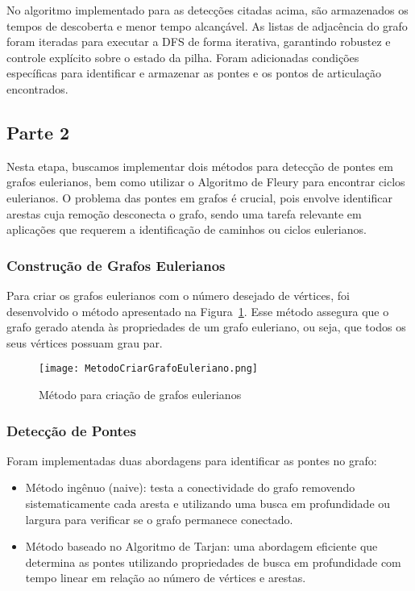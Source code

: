 \documentclass[12pt]{article}
\begin{document}
No algoritmo implementado para as detecções citadas acima, são armazenados os tempos de descoberta e menor tempo alcançável. As listas de adjacência do grafo foram iteradas para executar a DFS de forma iterativa, garantindo robustez e controle explícito sobre o estado da pilha. Foram adicionadas condições específicas para identificar e armazenar as pontes e os pontos de articulação encontrados.

\subsection{Parte 2}

Nesta etapa, buscamos implementar dois métodos para detecção de pontes em grafos eulerianos, bem como utilizar o Algoritmo de Fleury para encontrar ciclos eulerianos. O problema das pontes em grafos é crucial, pois envolve identificar arestas cuja remoção desconecta o grafo, sendo uma tarefa relevante em aplicações que requerem a identificação de caminhos ou ciclos eulerianos.

\subsubsection{Construção de Grafos Eulerianos}
Para criar os grafos eulerianos com o número desejado de vértices, foi desenvolvido o método apresentado na Figura~\ref{fig:metodoCriarGrafoEuleriano}. Esse método assegura que o grafo gerado atenda às propriedades de um grafo euleriano, ou seja, que todos os seus vértices possuam grau par.

\begin{figure}[ht]
\centering
\texttt{[image: MetodoCriarGrafoEuleriano.png]}
\caption{Método para criação de grafos eulerianos}
\label{fig:metodoCriarGrafoEuleriano}
\end{figure}

\subsubsection{Detecção de Pontes}
Foram implementadas duas abordagens para identificar as pontes no grafo:
\begin{itemize}
    \item Método ingênuo (naive): testa a conectividade do grafo removendo sistematicamente cada aresta e utilizando uma busca em profundidade ou largura para verificar se o grafo permanece conectado.
    \item Método baseado no Algoritmo de Tarjan: uma abordagem eficiente que determina as pontes utilizando propriedades de busca em profundidade com tempo linear em relação ao número de vértices e arestas.
\end{itemize}
\end{document}

